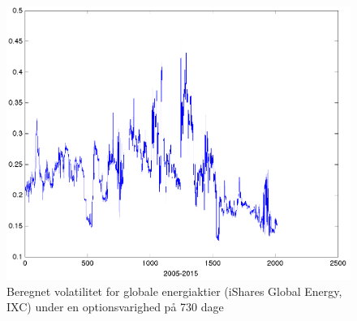 \documentclass{article}
\begin{document}
\begin{figure}
\centerline{\includegraphics[scale=0.8]{../matlab/figs/implied_vol_730_guan}}
\caption{Beregnet volatilitet for globale energiaktier (iShares Global Energy, IXC) under en optionsvarighed på 730 dage}
\label{fig:option_vol_730}
\end{figure}
\end{document}
